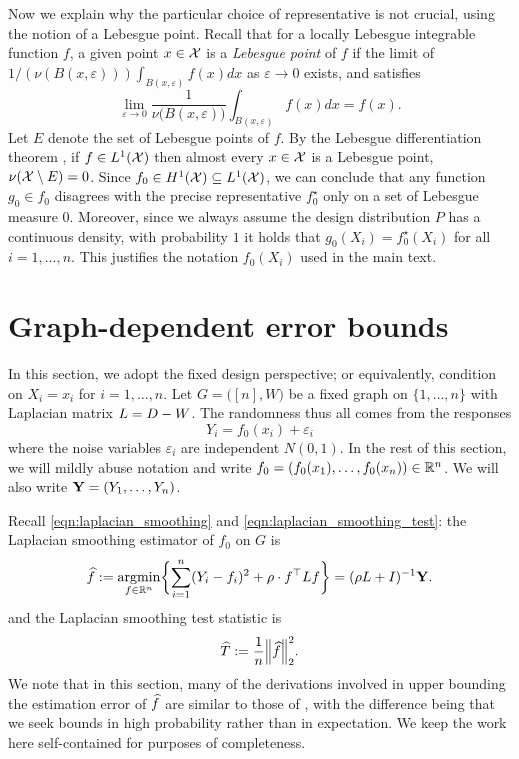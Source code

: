 Now we explain why the particular choice of representative is not crucial, using the notion of a Lebesgue point. Recall that for a locally Lebesgue integrable function $f$, a given point $x \in \mathcal{X}$ is a \emph{Lebesgue point} of $f$ if the limit of $1/(\nu(B(x,\varepsilon)))\int_{B(x,\varepsilon)} f(x) dx$ as $\varepsilon \to 0$ exists, and satisfies
\begin{equation*}
\lim_{\varepsilon \to 0} \frac{1}{\nu\bigl(B(x,\varepsilon)\bigr)} \int_{B(x,\varepsilon)} f(x) dx = f(x).
\end{equation*}
Let $E$ denote the set of Lebesgue points of $f$. By the Lebesgue differentiation theorem \citep{evans15}, if $f \in L^1(\mathcal{X})$ then almost every $x \in \mathcal{X}$ is a Lebesgue point, $\nu(\mathcal{X}\setminus E) = 0$. Since $f_0 \in H^1(\mathcal{X}) \subseteq L^1(\mathcal{X})$, we can conclude that any function $g_0 \in f_0$ disagrees with the precise representative $f_0^{\star}$ only on a set of Lebesgue measure 0. Moreover, since we always assume the design distribution $P$ has a continuous density, with probability $1$ it holds that $g_0(X_i) = f_0^{\star}(X_i)$ for all $i = 1,\ldots,n$. This justifies the notation $f_0(X_i)$ used in the main text.

\vfill

\clearpage

\section{Graph-dependent error bounds}
\label{sec:fixed_graph_error_bounds}

In this section, we adopt the fixed design perspective; or equivalently, condition on $X_i = x_i$ for $i = 1,\ldots,n$. Let $G = \bigl([n],W\bigr)$ be a fixed graph on $\{1,\ldots,n\}$ with Laplacian matrix $L = D - W$. The randomness thus all comes from the responses 
\begin{equation}
\label{eqn:fixed_graph_regression_model}
Y_i = f_{0}(x_i) + \varepsilon_i
\end{equation}
where the noise variables $\varepsilon_i$ are independent $N(0,1)$. In the rest of this section, we will mildly abuse notation and write $f_0 = (f_0(x_1),\ldots,f_0(x_n)) \in \mathbb{R}^n$. We will also write ${\bf Y} = (Y_1,\ldots,Y_n)$.

Recall \eqref{eqn:laplacian_smoothing} and \eqref{eqn:laplacian_smoothing_test}: the Laplacian smoothing estimator of $f_0$ on $G$ is
\begin{equation*}
\label{eqn:ls_G}
\widehat{f} := \operatorname*{argmin}_{f \in \mathbb{R}^n} \biggl\{ \sum_{i = 1}^{n}(Y_i - f_i)^2 + \rho \cdot f^{\top} L f \biggr\} = (\rho L + I)^{-1}{\bf Y}.
\end{equation*}
and the Laplacian smoothing test statistic is 
\begin{equation*}
\label{eqn:ls_ts_G}
\widehat{T} := \frac{1}{n} \Bigl\|\widehat{f}\Bigr\|_2^2.
\end{equation*}
We note that in this section, many of the derivations involved in upper bounding the estimation error of $\widehat{f}$ are similar to those of \cite{sadhanala16}, with the difference being that we seek bounds in high probability rather than in expectation. We keep the work here self-contained for purposes of completeness.

